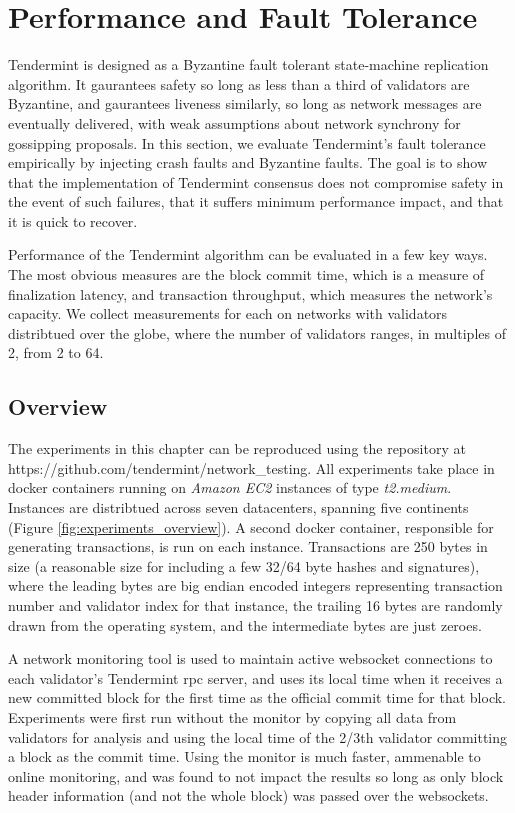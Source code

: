\chapter{Performance and Fault Tolerance}
\label{ch:performance}

Tendermint is designed as a Byzantine fault tolerant state-machine replication algorithm.
It gaurantees safety so long as less than a third of validators are Byzantine, 
and gaurantees liveness similarly, so long as network messages are eventually delivered,
with weak assumptions about network synchrony for gossipping proposals.
In this section, we evaluate Tendermint's fault tolerance empirically by injecting 
crash faults and Byzantine faults.
The goal is to show that the implementation of Tendermint consensus does not compromise safety in the event of such failures,
that it suffers minimum performance impact, and that it is quick to recover.

Performance of the Tendermint algorithm can be evaluated in a few key ways.
The most obvious measures are the block commit time, which is a measure of finalization latency, 
and transaction throughput, which measures the network's capacity.
We collect measurements for each on networks with validators distribtued over the globe, 
where the number of validators ranges, in multiples of 2, from 2 to 64.

\section{Overview}

The experiments in this chapter can be reproduced using the repository at https://github.com/tendermint/network\_testing.
All experiments take place in docker containers running on \emph{Amazon EC2} instances of type \emph{t2.medium}.
Instances are distribtued across seven datacenters, spanning five continents (Figure \ref{fig:experiments_overview}).
A second docker container, responsible for generating transactions, is run on each instance.
Transactions are 250 bytes in size (a reasonable size for including a few 32/64 byte hashes and signatures),
where the leading bytes are big endian encoded integers representing transaction number and validator index for that instance,
the trailing 16 bytes are randomly drawn from the operating system, and the intermediate bytes are just zeroes.

A network monitoring tool is used to maintain active websocket connections to each validator's Tendermint rpc server,
and uses its local time when it receives a new committed block for the first time as the official commit time for that block.
Experiments were first run without the monitor by copying all data from validators for analysis and using the local time
of the 2/3th validator committing a block as the commit time. 
Using the monitor is much faster, ammenable to online monitoring, and was found to not impact the results 
so long as only block header information (and not the whole block) was passed over the websockets.

